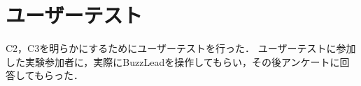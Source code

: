 \documentclass[titlepage]{jsreport}
\begin{document}
    
\section{ユーザーテスト}
C2，C3を明らかにするためにユーザーテストを行った．
ユーザーテストに参加した実験参加者に，実際にBuzzLeadを操作してもらい，その後アンケートに回答してもらった．
\end{document}
